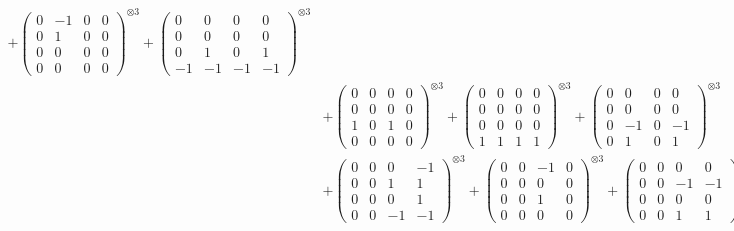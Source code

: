 \documentclass{article}
\begin{document}
{\begin{align}
            + \begin{pmatrix} 0 & -1 & 0 & 0 \\ 0 & 1 & 0 & 0 \\ 0 & 0 & 0 & 0 \\ 0 & 0 & 0 & 0 \end{pmatrix}^{\otimes 3} 
            + \begin{pmatrix} 0 & 0 & 0 & 0 \\ 0 & 0 & 0 & 0 \\ 0 & 1 & 0 & 1 \\ -1 & -1 & -1 & -1 \end{pmatrix}^{\otimes 3} \\
        &+ \label{Rs16-Rc11-Strassen-1-c10} \begin{pmatrix} 0 & 0 & 0 & 0 \\ 0 & 0 & 0 & 0 \\ 1 & 0 & 1 & 0 \\ 0 & 0 & 0 & 0 \end{pmatrix}^{\otimes 3} 
            + \begin{pmatrix} 0 & 0 & 0 & 0 \\ 0 & 0 & 0 & 0 \\ 0 & 0 & 0 & 0 \\ 1 & 1 & 1 & 1 \end{pmatrix}^{\otimes 3} 
            + \begin{pmatrix} 0 & 0 & 0 & 0 \\ 0 & 0 & 0 & 0 \\ 0 & -1 & 0 & -1 \\ 0 & 1 & 0 & 1 \end{pmatrix}^{\otimes 3} \\
        &+ \label{Rs16-Rc11-Strassen-1-c13} \begin{pmatrix} 0 & 0 & 0 & -1 \\ 0 & 0 & 1 & 1 \\ 0 & 0 & 0 & 1 \\ 0 & 0 & -1 & -1 \end{pmatrix}^{\otimes 3} 
            + \begin{pmatrix} 0 & 0 & -1 & 0 \\ 0 & 0 & 0 & 0 \\ 0 & 0 & 1 & 0 \\ 0 & 0 & 0 & 0 \end{pmatrix}^{\otimes 3} 
            + \begin{pmatrix} 0 & 0 & 0 & 0 \\ 0 & 0 & -1 & -1 \\ 0 & 0 & 0 & 0 \\ 0 & 0 & 1 & 1 \end{pmatrix}^{\otimes 3} \\

\end{align}}
\end{document}
